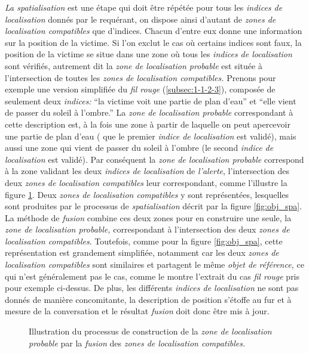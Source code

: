 \emph{La spatialisation} est une étape qui doit être répétée pour tous
les \emph{indices de localisation} donnés par le requérant, on dispose
ainsi d'autant de \emph{zones de localisation compatibles} que
d'indices. Chacun d'entre eux donne une information sur la position de
la victime. Si l'on exclut le cas où certains indices sont faux, la
position de la victime se situe dans une zone où tous les
\emph{indices de localisation} sont vérifiés, autrement dit la
\emph{zone de localisation probable} est située à l'intersection de
toutes les \emph{zones de localisation compatibles.}
%
Prenons pour exemple une version simplifiée du \emph{fil rouge}
(\ref{subsec:1-1-2-3}), composée de seulement deux \emph{indices:}
\enquote{la victime voit une partie de plan d'eau} et \enquote{elle
  vient de passer du soleil à l'ombre.}  La \emph{zone de localisation
  probable} correspondant à cette description est, à la fois une zone
à partir de laquelle on peut apercevoir une partie de plan d'eau (\ie
que le premier \emph{indice de localisation} est validé), mais aussi
une zone qui vient de passer du soleil à l'ombre (\ie le second
\emph{indice de localisation} est validé). Par conséquent la
\emph{zone de localisation probable} correspond à la zone validant les
deux \emph{indices de localisation} de \emph{l'alerte}, \ie
l'intersection des deux \emph{zones de localisation compatibles} leur
correspondant, comme l'illustre la figure \ref{fig:obj_fus}. Deux
\emph{zones de localisation compatibles} y sont représentées,
lesquelles sont produites par le processus de \emph{spatialisation}
décrit par la figure \ref{fig:obj_spa}. La méthode de \emph{fusion}
combine ces deux zones pour en construire une seule, la \emph{zone de
  localisation probable,} correspondant à l'intersection des deux
\emph{zones de localisation compatibles}. Toutefois, comme pour la
figure \ref{fig:obj_spa}, cette représentation est grandement
simplifiée, notamment car les deux \emph{zones de localisation
  compatibles} sont similaires et partagent le même \emph{objet de
  référence,} ce qui n'est généralement pas le cas, comme le montre
l'extrait du cas \emph{fil rouge} pris pour exemple ci-dessus. De
plus, les différents \emph{indices de localisation} ne sont pas donnés
de manière concomitante, la description de position s'étoffe au fur et
à mesure de la conversation et le résultat \emph{fusion} doit donc
être mis à jour.

\begin{figure}
  \centering
  
  \caption{Illustration du processus de construction de la \emph{zone
      de localisation probable} par la \emph{fusion} des \emph{zones
      de localisation compatibles.}}
  \label{fig:obj_fus}
\end{figure}

